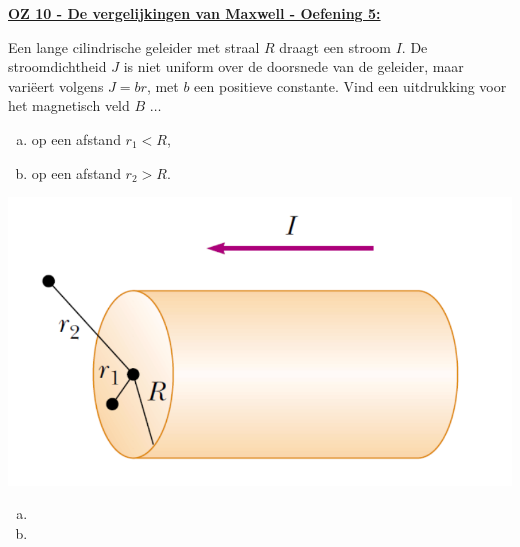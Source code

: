 \textbf{\underline{OZ 10 - De vergelijkingen van Maxwell - Oefening 5:}}
\vspace{0.5cm}

\begin{minipage}{.73\textwidth}
    Een lange cilindrische geleider met straal $R$ draagt een stroom $I$. De stroomdichtheid $J$ is niet uniform over de doorsnede van de geleider, maar variëert volgens $J = br$, met $b$ een positieve constante. Vind een uitdrukking voor het magnetisch veld $B$ $\ldots$
    \begin{enumerate}[(a)]
        \item op een afstand $r_1 < R$,
        \item op een afstand $r_2 > R$.
    \end{enumerate}
\end{minipage}
\begin{minipage}{.23\textwidth}
    \begin{center}
        \includegraphics[scale = 0.4]{oz10/resources/Oz10Oef5.png}
    \end{center}
\end{minipage}

\begin{enumerate}[(a)]
    \item 
        \begin{description}[labelwidth=1.5cm, leftmargin=!]
            \item[Geg. :]   
            \item[Gevr. :] 
            \item[Opl. :]   
        \end{description}
    \item
        \begin{description}[labelwidth=1.5cm, leftmargin=!]
            \item[Geg. :]   
            \item[Gevr. :] 
            \item[Opl. :]   
        \end{description}
\end{enumerate}

\vspace{1cm}